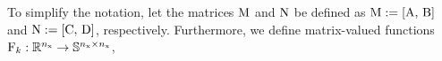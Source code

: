 To simplify the notation, let the matrices $\mxM$ and $\mxN$ be defined as $\mxM := [\mxA,\, \mxB]$ and $\mxN := [\mxC, \, \mxD]$, respectively. 
Furthermore, we define matrix-valued functions 
$\mxF_k:\Rbb^{\Nx}\to\Sbb^{\Nx\times\Nx}$,
